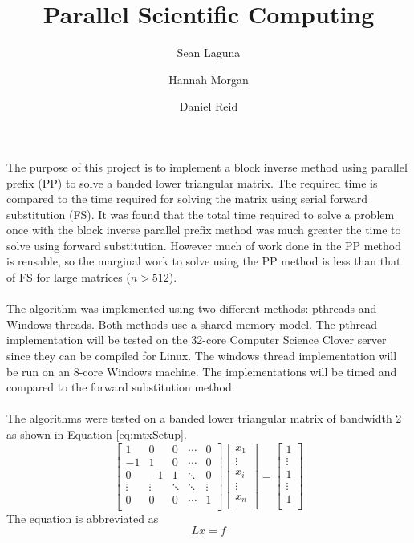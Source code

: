 \documentclass[a4paper,12pt]{article}
\title{Parallel Scientific Computing}
\author{Sean Laguna  \\
	\and 
	Hannah Morgan \\
	\and
	Daniel Reid \\
	}
\date{\vspace{-5ex}}
\begin{document}
\maketitle



\paragraph*{}
	The purpose of this project is to implement a block inverse method using parallel prefix (PP) to solve a banded lower triangular matrix.  The required time is compared to the time required for solving the matrix using serial forward substitution (FS).  It was found that the total time required to solve a problem once with the block inverse parallel prefix  method was much greater the time to solve using forward substitution.  However much of work done in the PP method is reusable, so the marginal work to solve using the PP method is less than that of FS for large matrices ($n > 512$).
\paragraph*{}
	The algorithm was implemented using two different methods: pthreads and Windows threads.  Both methods use a shared memory model.  The pthread implementation will be tested on the 32-core Computer Science Clover server since they can be compiled for Linux.  The windows thread implementation will be run on an 8-core Windows machine.  The implementations will be timed and compared to the forward substitution method.

\paragraph*{}
	The algorithms were tested on a banded lower triangular matrix of bandwidth 2 as shown in Equation \ref{eq:mtxSetup}.
	\begin{equation} \label{eq:mtxSetup}
		\begin{bmatrix}
		1 & 0 & 0  &  \cdots & 0  \\
		-1  & 1  & 0&   \cdots & 0 \\
		0 & -1 & 1  & \ddots & 0 \\
		\vdots & \vdots & \ddots  & \ddots & \vdots\\
		 0 & 0 & 0 & \cdots &  1  \\
		\end{bmatrix}
		\begin{bmatrix}
		x_1\\
		\vdots \\
		x_i\\
		\vdots \\
		x_n\\
		\end{bmatrix} = 
		\begin{bmatrix}
		1\\
		\vdots \\
		1\\
		\vdots \\
		1\\
		\end{bmatrix}
	\end{equation}
	The equation is abbreviated as $$Lx=f$$
\end{document}

